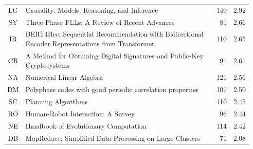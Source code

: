 \begin{table}[t]
\begin{threeparttable}
\begin{tabular}{clrc}
LG & Causality: Models, Reasoning, and Inference & \cellcolor{green!8}140 & \cellcolor{green!8}2.92 \\
SY & Three-Phase PLLs: A Review of Recent Advances & \cellcolor{green!8}81 & \cellcolor{green!8}2.66 \\
IR & BERT4Rec: Sequential Recommendation with Bidirectional Encoder Representations from Transformer & \cellcolor{green!8}110 & \cellcolor{green!8}2.65 \\
CR & A Method for Obtaining Digital Signatures and Public-Key Cryptosystems & \cellcolor{green!8}91 & \cellcolor{green!8}2.61 \\
NA & Numerical Linear Algebra & \cellcolor{green!8}121 & \cellcolor{green!8}2.56 \\
DM & Polyphase codes with good periodic correlation properties & \cellcolor{green!8}107 & \cellcolor{green!8}2.50 \\
SC & Planning Algorithms & \cellcolor{green!8}110 & \cellcolor{green!8}2.45 \\
RO & Human-Robot Interaction: A Survey & \cellcolor{green!8}96 & \cellcolor{green!8}2.44 \\
NE & Handbook of Evolutionary Computation & \cellcolor{green!8}114 & \cellcolor{green!8}2.42 \\
DB & MapReduce: Simplified Data Processing on Large Clusters & \cellcolor{green!8}71 & \cellcolor{green!8}2.08 \\
\bottomrule
\end{tabular}
  \end{threeparttable}
\end{table}